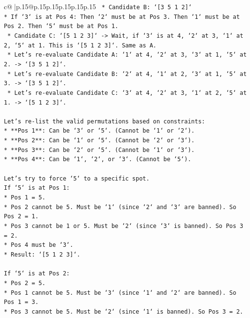 \documentclass{article}
\begin{document}
{\begin{supertabular}{c@{$\;$}|p{.15\linewidth}@{}p{.15\linewidth}p{.15\linewidth}p{.15\linewidth}p{.15\linewidth}p{.15\linewidth}}
{{{\texttt{    *   Candidate B: `{[}3 5 1 2{]}`} \\
\texttt{*   If `3` is at Pos 4: Then `2` must be at Pos 3. Then `1` must be at Pos 2. Then `5` must be at Pos 1.} \\
\texttt{    *   Candidate C: `{[}5 1 2 3{]}` {-}> Wait, if `3` is at 4, `2` at 3, `1` at 2, `5` at 1. This is `{[}5 1 2 3{]}`. Same as A.} \\
\texttt{    *   Let's re{-}evaluate Candidate A: `1` at 4, `2` at 3, `3` at 1, `5` at 2. {-}> `{[}3 5 1 2{]}`.} \\
\texttt{    *   Let's re{-}evaluate Candidate B: `2` at 4, `1` at 2, `3` at 1, `5` at 3. {-}> `{[}3 5 1 2{]}`.} \\
\texttt{    *   Let's re{-}evaluate Candidate C: `3` at 4, `2` at 3, `1` at 2, `5` at 1. {-}> `{[}5 1 2 3{]}`.} \\
\\ 
\texttt{Let's re{-}list the valid permutations based on constraints:} \\
\texttt{*   **Pos 1**: Can be `3` or `5`. (Cannot be `1` or `2`).} \\
\texttt{*   **Pos 2**: Can be `1` or `5`. (Cannot be `2` or `3`).} \\
\texttt{*   **Pos 3**: Can be `2` or `5`. (Cannot be `1` or `3`).} \\
\texttt{*   **Pos 4**: Can be `1`, `2`, or `3`. (Cannot be `5`).} \\
\\ 
\texttt{Let's try to force `5` to a specific spot.} \\
\texttt{If `5` is at Pos 1:} \\
\texttt{*   Pos 1 = 5.} \\
\texttt{*   Pos 2 cannot be 5. Must be `1` (since `2` and `3` are banned). So Pos 2 = 1.} \\
\texttt{*   Pos 3 cannot be 1 or 5. Must be `2` (since `3` is banned). So Pos 3 = 2.} \\
\texttt{*   Pos 4 must be `3`.} \\
\texttt{*   Result: `{[}5 1 2 3{]}`.} \\
\\ 
\texttt{If `5` is at Pos 2:} \\
\texttt{*   Pos 2 = 5.} \\
\texttt{*   Pos 1 cannot be 5. Must be `3` (since `1` and `2` are banned). So Pos 1 = 3.} \\
\texttt{*   Pos 3 cannot be 5. Must be `2` (since `1` is banned). So Pos 3 = 2.} \\
}}}
\end{supertabular}}
\end{document}
